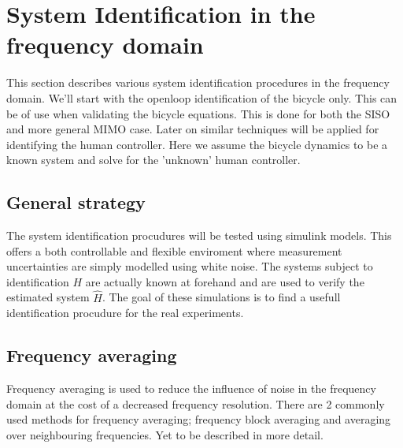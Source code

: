 \chapter{System Identification in the frequency domain}
This section describes various system identification procedures in the frequency domain. We'll start with the openloop identification of the bicycle only. This can be of use when validating the bicycle equations. This is done for both the SISO and more general MIMO case. Later on similar techniques will be applied for identifying the human controller. Here we assume the bicycle dynamics to be  a known system and solve for the 'unknown' human controller.
\section{General strategy}
The system identification procudures will be tested using simulink models. This offers a both controllable and flexible enviroment where measurement uncertainties are simply modelled using white noise. The systems subject to identification $H$ are actually known at forehand and are used to verify the estimated system $\hat{H}$. The goal of these simulations is to find a usefull identification procudure for the real experiments. 

\section{Frequency averaging}
Frequency averaging is used to reduce the influence of noise in the frequency domain at the cost of a decreased frequency resolution. There are 2 commonly used methods for frequency averaging; frequency block averaging and averaging over neighbouring frequencies. Yet to be described in more detail. 


